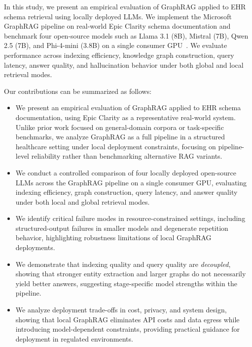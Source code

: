 \documentclass{article}
\begin{document}
In this study, we present an empirical evaluation of GraphRAG applied to EHR schema retrieval using locally deployed LLMs. We implement the Microsoft GraphRAG pipeline on real-world Epic Clarity schema documentation and benchmark four open-source models such as Llama 3.1 (8B), Mistral (7B), Qwen 2.5 (7B), and Phi-4-mini (3.8B) on a single consumer GPU~\cite{jiang20236g,grattafiori2024llama,abdin2024phi,yang2025qwen3}. We evaluate performance across indexing efficiency, knowledge graph construction, query latency, answer quality, and hallucination behavior under both global and local retrieval modes.

Our contributions can be summarized as follows:
\begin{itemize}
    \item We present an empirical evaluation of GraphRAG applied to EHR schema documentation, using Epic Clarity as a representative real-world system. Unlike prior work focused on general-domain corpora or task-specific benchmarks, we analyze GraphRAG as a full pipeline in a structured healthcare setting under local deployment constraints, focusing on pipeline-level reliability rather than benchmarking alternative RAG variants.
    
    \item We conduct a controlled comparison of four locally deployed open-source LLMs across the GraphRAG pipeline on a single consumer GPU, evaluating indexing efficiency, graph construction, query latency, and answer quality under both local and global retrieval modes.
    
    \item We identify critical failure modes in resource-constrained settings, including structured-output failures in smaller models and degenerate repetition behavior, highlighting robustness limitations of local GraphRAG deployments.
    
    \item We demonstrate that indexing quality and query quality are \emph{decoupled}, showing that stronger entity extraction and larger graphs do not necessarily yield better answers, suggesting stage-specific model strengths within the pipeline.
    
    \item We analyze deployment trade-offs in cost, privacy, and system design, showing that local GraphRAG eliminates API costs and data egress while introducing model-dependent constraints, providing practical guidance for deployment in regulated environments.
\end{itemize}
\end{document}
